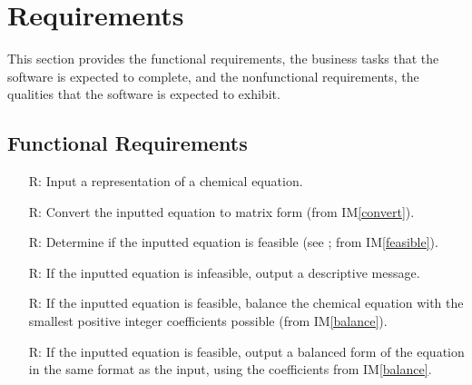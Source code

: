 \documentclass[12pt]{article}
\newcommand{\iref}[1]{IM\ref{#1}}
\newcounter{reqnum} %
\begin{document}

\newpage

\section{Requirements}
This section provides the functional requirements, the business tasks that the
software is expected to complete, and the nonfunctional requirements, the
qualities that the software is expected to exhibit.

\subsection{Functional Requirements} \label{sec_funcReqs}

\begin{itemize}

  \item[R\refstepcounter{reqnum}\thereqnum \label{R_input}:] Input a
    representation of a chemical equation.

  \item[R\refstepcounter{reqnum}\thereqnum \label{R_convert}:] Convert the
    inputted equation to matrix form (from \iref{convert}).

  \item[R\refstepcounter{reqnum}\thereqnum \label{R_feasible}:] Determine if the
    inputted equation is feasible (see ;	from
    \iref{feasible}).

  \item[R\refstepcounter{reqnum}\thereqnum \label{R_infeasOutput}:] If the
    inputted equation is infeasible, output a descriptive message.

  \item[R\refstepcounter{reqnum}\thereqnum \label{R_balance}:] If the
    inputted equation is feasible, balance the chemical equation with the smallest
    positive integer coefficients possible (from \iref{balance}).

  \item[R\refstepcounter{reqnum}\thereqnum \label{R_feasOutput}:] If the
    inputted equation is feasible, output a balanced form of the equation in the
    same format as the input, using the coefficients from \iref{balance}.

\end{itemize}
\end{document}
